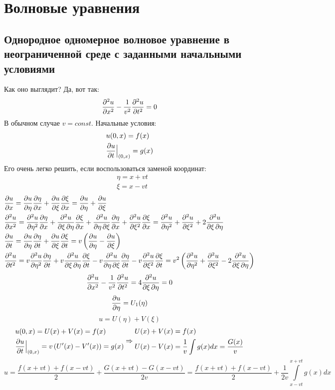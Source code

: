 \section{Волновые уравнения}
\subsection{Однородное одномерное волновое уравнение в неограниченной среде с заданными начальными условиями}

Как оно выглядит? Да, вот так:
\[
	\dfs{u}{x} - \frac{1}{v^2} \dfs{u}{t} = 0
\]
В обычном случае $v = const$. Начальные условия:
\[
	\begin{aligned}
		& u(0, x) = f(x) \\
		& \dff{u}{t} \Big|_{(0, x)} = g(x)
	\end{aligned}
\]
Его очень легко решить, если воспользоваться заменой координат:
\[
	\begin{aligned}
	& \eta = x + v t \\
	& \xi = x - v t
	\end{aligned}	
\]
\[
	\begin{aligned}
		& \dff{u}{x} = \dff{u}{\eta} \dff{\eta}{x} + \dff{u}{\xi} \dff{\xi}{x} =
			\dff{u}{\eta} + \dff{u}{\xi} \\
		& \dfs{u}{x} = \dfs{u}{\eta} \dff{\eta}{x} + \dfss{u}{\xi}{\eta} \dff{\xi}{x} + \dfss{u}{\eta}{\xi} \dff{\eta}{x} +  \dfs{u}{\xi} \dff{\xi}{x} =
			\dfs{u}{\eta} +  \dfs{u}{\xi} + 2 \dfss{u}{\xi}{\eta} \\
		& \dff{u}{t} = \dff{u}{\eta} \dff{\eta}{t} + \dff{u}{\xi} \dff{\xi}{t} =
			v \left(\dff{u}{\eta} - \dff{u}{\xi}\right) \\
		& \dfs{u}{t} = v\dfs{u}{\eta} \dff{\eta}{t} + v\dfss{u}{\xi}{\eta} \dff{\xi}{t} - v\dfss{u}{\eta}{\xi} \dff{\eta}{t} -  v\dfs{u}{\xi} \dff{\xi}{t} =
		v^2\left(\dfs{u}{\eta} +  \dfs{u}{\xi} - 2 \dfss{u}{\xi}{\eta} \right)\\ 
	\end{aligned}
\]
\[
	\dfs{u}{x} - \frac{1}{v^2} \dfs{u}{t} = 4 \dfss{u}{\xi}{\eta} = 0
\]
\[
	\dff{u}{\eta} = U_1(\eta)
\]
\[
	u = U(\eta) + V(\xi)
\]
\[
	\begin{aligned}
	& u(0, x) = U(x) + V(x) = f(x) \\
	& \dff{u}{t} \Big|_{(0, x)} = v \left(U'(x) - V'(x)\right) = g(x)
	\end{aligned}
	\Rightarrow
	\begin{aligned}
	& U(x) + V(x) = f(x) \\
	& U(x) - V(x) = \frac{1}{v} \int g(x) dx = \frac{G(x)}{v}
	\end{aligned}
\]
\[
	u = \frac{f(x + v t) + f(x - v t)}{2} + \frac{G(x + v t) - G(x - v t)}{2 v} = \frac{f(x + v t) + f(x - v t)}{2} + \frac{1}{2 v} \int\limits_{x - v t}^{x + v t} g(x) dx
\]

